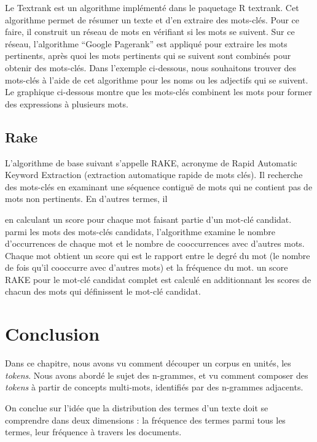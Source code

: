 \documentclass[
  letterpaper,
  DIV=11,
  numbers=noendperiod]{scrreprt}
\begin{document}
Le Textrank est un algorithme implémenté dans le paquetage R textrank.
Cet algorithme permet de résumer un texte et d'en extraire des
mots-clés. Pour ce faire, il construit un réseau de mots en vérifiant si
les mots se suivent. Sur ce réseau, l'algorithme ``Google Pagerank'' est
appliqué pour extraire les mots pertinents, après quoi les mots
pertinents qui se suivent sont combinés pour obtenir des mots-clés. Dans
l'exemple ci-dessous, nous souhaitons trouver des mots-clés à l'aide de
cet algorithme pour les noms ou les adjectifs qui se suivent. Le
graphique ci-dessous montre que les mots-clés combinent les mots pour
former des expressions à plusieurs mots.

\subsection{Rake}\label{rake}

L'algorithme de base suivant s'appelle RAKE, acronyme de Rapid Automatic
Keyword Extraction (extraction automatique rapide de mots clés). Il
recherche des mots-clés en examinant une séquence contiguë de mots qui
ne contient pas de mots non pertinents. En d'autres termes, il

en calculant un score pour chaque mot faisant partie d'un mot-clé
candidat. parmi les mots des mots-clés candidats, l'algorithme examine
le nombre d'occurrences de chaque mot et le nombre de cooccurrences avec
d'autres mots. Chaque mot obtient un score qui est le rapport entre le
degré du mot (le nombre de fois qu'il cooccurre avec d'autres mots) et
la fréquence du mot. un score RAKE pour le mot-clé candidat complet est
calculé en additionnant les scores de chacun des mots qui définissent le
mot-clé candidat.

\section{Conclusion}\label{conclusion-5}

Dans ce chapitre, nous avons vu comment découper un corpus en unités,
les \emph{tokens}. Nous avons abordé le sujet des n-grammes, et vu
comment composer des \emph{tokens} à partir de concepts multi-mots,
identifiés par des n-grammes adjacents.

On conclue sur l'idée que la distribution des termes d'un texte doit se
comprendre dans deux dimensions : la fréquence des termes parmi tous les
termes, leur fréquence à travers les documents.

\end{document}
